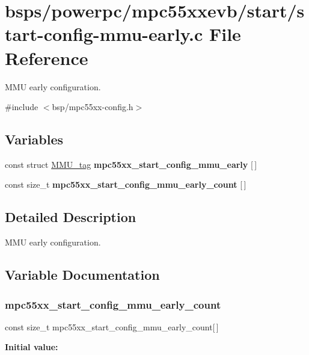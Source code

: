 \hypertarget{start-config-mmu-early_8c}{}\section{bsps/powerpc/mpc55xxevb/start/start-\/config-\/mmu-\/early.c File Reference}
\label{start-config-mmu-early_8c}


M\+MU early configuration.  


{\ttfamily \#include $<$bsp/mpc55xx-\/config.\+h$>$}\newline
\subsection*{Variables}
\begin{DoxyCompactItemize}
\item 
\mbox{\label{start-config-mmu-early_8c_a30bbb650b0c4c73784243fd48003eadc}} 
const struct \mbox{\hyperlink{structMMU__tag}{M\+M\+U\+\_\+tag}} {\bfseries mpc55xx\+\_\+start\+\_\+config\+\_\+mmu\+\_\+early} \mbox{[}$\,$\mbox{]}
\item 
const size\+\_\+t {\bfseries mpc55xx\+\_\+start\+\_\+config\+\_\+mmu\+\_\+early\+\_\+count} \mbox{[}$\,$\mbox{]}
\end{DoxyCompactItemize}


\subsection{Detailed Description}
M\+MU early configuration. 



\subsection{Variable Documentation}
\mbox{\label{start-config-mmu-early_8c_aad0120b3ba4258769f2a22aa2801ef8a}} 
\subsubsection{\texorpdfstring{mpc55xx\_start\_config\_mmu\_early\_count}{mpc55xx\_start\_config\_mmu\_early\_count}}
{\footnotesize\ttfamily const size\+\_\+t mpc55xx\+\_\+start\+\_\+config\+\_\+mmu\+\_\+early\+\_\+count\mbox{[}$\,$\mbox{]}}

{\bfseries Initial value\+:}
\begin{DoxyCode}{0}
\DoxyCodeLine{= \{}
\DoxyCodeLine{}
\DoxyCodeLine{\}}

\end{DoxyCode}
